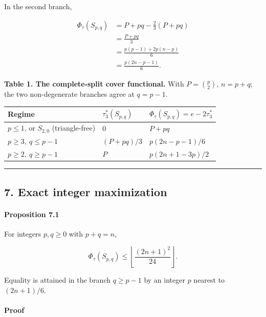 \documentclass[english,11pt,a4paper]{article}
\newcounter{none}
\begin{document}
In the second branch,

\[
\begin{aligned}
\Phi_\tau(S_{p,q})
&=
P+pq-\frac23(P+pq)\\
&=
\frac{P+pq}{3}\\
&=
\frac{p(p-1)+2p(n-p)}6\\
&=
\frac{p(2n-p-1)}6.
\end{aligned}
\]

\textbf{Table 1. The complete-split cover functional.} With
\(P=\binom p2\), \(n=p+q\); the two non-degenerate branches agree at
\(q=p-1\).

{\def\LTcaptype{none} %
\begin{longtable}[]{@{}lll@{}}
\toprule\noalign{}
Regime & \(\tau_3^*(S_{p,q})\) & \(\Phi_\tau(S_{p,q})=e-2\tau_3^*\) \\
\midrule\noalign{}
\endhead
\bottomrule\noalign{}
\endlastfoot
\(p\le1\), or \(S_{2,0}\) (triangle-free) & \(0\) & \(P+pq\) \\
\(p\ge3,\ q\le p-1\) & \((P+pq)/3\) & \(p(2n-p-1)/6\) \\
\(p\ge2,\ q\ge p-1\) & \(P\) & \(p(2n+1-3p)/2\) \\
\end{longtable}
}

\begin{center}\rule{0.5\linewidth}{0.5pt}\end{center}

\subsection{7. Exact integer
maximization}\label{exact-integer-maximization}

\paragraph{Proposition 7.1}\label{proposition-7.1}

For integers \(p,q\ge0\) with \(p+q=n\),

\[
\Phi_\tau(S_{p,q})
\le
\left\lfloor\frac{(2n+1)^2}{24}\right\rfloor.
\]

Equality is attained in the branch \(q\ge p-1\) by an integer \(p\)
nearest to \((2n+1)/6\).

\paragraph{Proof}\label{proof-11}
\end{document}
